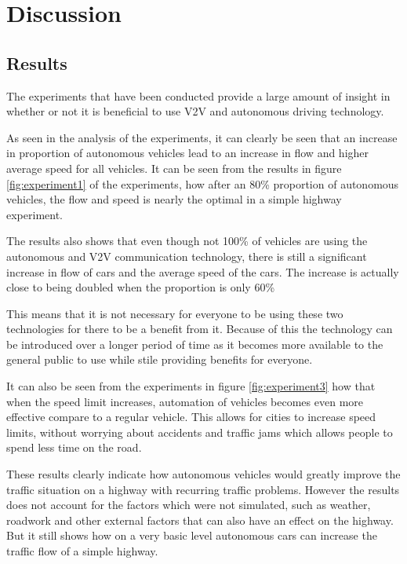 \section{Discussion}
\subsection{Results}
The experiments that have been conducted provide a large amount of insight in whether or not it is beneficial to use V2V and autonomous driving technology. 

As seen in the analysis of the experiments, it can clearly be seen that an increase in proportion of autonomous vehicles lead to an increase in flow and higher average speed for all vehicles. It can be seen from the results in figure \ref{fig:experiment1} of the experiments, how after an 80\% proportion of autonomous vehicles, the flow and speed is nearly the optimal in a simple highway experiment. 

The results also shows that even though not 100\% of vehicles are using the autonomous and V2V communication technology, there is still a significant increase in flow of cars and the average speed of the cars. The increase is actually close to being doubled when the proportion is only 60\% 

This means that it is not necessary for everyone to be using these two technologies for there to be a benefit from it. Because of this the technology can be introduced over a longer period of time as it becomes more available to the general public to use while stile providing benefits for everyone.  

It can also be seen from the experiments in figure \ref{fig:experiment3} how that when the speed limit increases, automation of vehicles becomes even more effective compare to a regular vehicle. 
This allows for cities to increase speed limits, without worrying about accidents and traffic jams which allows people to spend less time on the road.

These results clearly indicate how autonomous vehicles would greatly improve the traffic situation on a highway with recurring traffic problems. However the results does not account for the factors which were not simulated, such as weather, roadwork and other external factors that can also have an effect on the highway. But it still shows how on a very basic level autonomous cars can increase the traffic flow of a simple highway.

